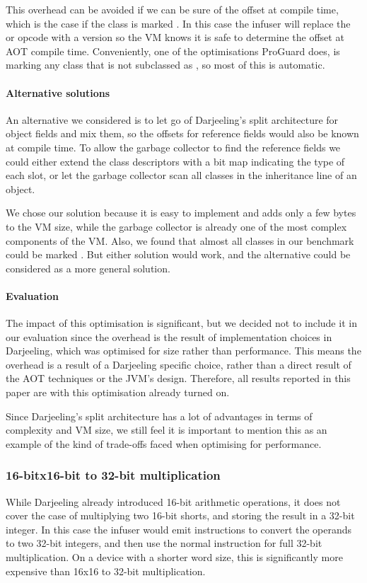 This overhead can be avoided if we can be sure of the offset at compile time, which is the case if the class is marked . In this case the infuser will replace the  or  opcode with a  version so the VM knows it is safe to determine the offset at AOT compile time. Conveniently, one of the optimisations ProGuard does, is marking any class that is not subclassed as , so most of this is automatic.

\paragraph{Alternative solutions} An alternative we considered is to let go of Darjeeling's split architecture for object fields and mix them, so the offsets for reference fields would also be known at compile time. To allow the garbage collector to find the reference fields we could either extend the class descriptors with a bit map indicating the type of each slot, or let the garbage collector scan all classes in the inheritance line of an object.

We chose our solution because it is easy to implement and adds only a few bytes to the VM size, while the garbage collector is already one of the most complex components of the VM. Also, we found that almost all classes in our benchmark could be marked . But either solution would work, and the alternative could be considered as a more general solution.

\paragraph{Evaluation}
The impact of this optimisation is significant, but we decided not to include it in our evaluation since the overhead is the result of implementation choices in Darjeeling, which was optimised for size rather than performance. This means the overhead is a result of a Darjeeling specific choice, rather than a direct result of the AOT techniques or the JVM's design. Therefore, all results reported in this paper are with this optimisation already turned on.

Since Darjeeling's split architecture has a lot of advantages in terms of complexity and VM size, we still feel it is important to mention this as an example of the kind of trade-offs faced when optimising for performance.

\subsubsection{ 16-bitx16-bit to 32-bit multiplication}
While Darjeeling already introduced 16-bit arithmetic operations, it does not cover the case of multiplying two 16-bit shorts, and storing the result in a 32-bit integer. In this case the infuser would emit  instructions to convert the operands to two 32-bit integers, and then use the normal  instruction for full 32-bit multiplication. On a device with a shorter word size, this is significantly more expensive than 16x16 to 32-bit multiplication.

